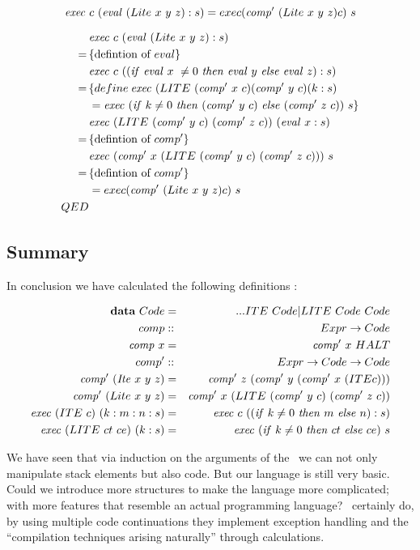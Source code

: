 \documentclass {article}
\begin{document}
\[ \mathit{exec\ } c\ (\mathit{eval\ }  (Lite\ x\ y\ z):s) = exec (\mathit{comp'\ }  (Lite\ x\ y\ z) c)\ s  \]

\begin{align*}
&\Exec c\ (\evalf  (Lite\ x\ y\ z):s) \\
=\, & \{ \mbox{defintion of}\ eval \} \\
&\Exec c\ ((\ifff \evalf  x\ \not= 0\ \tthen \evalf  y\ \eelse \evalf  z) :s) \\
=\, & \{ define\: \Exec (LITE\ (\Compp  x\ c) (\Compp  y\ c) (k : s) \\
&= \Exec (\ifff k \not=0\ \tthen (\Compp  y\ c)\ \eelse (\Compp  z\ c))\ s \} \\
& \Exec (LITE\ (\Compp  y\ c)\ (\Compp  z\ c))\ (\evalf  x : s) \\
=\, & \{ \mbox{defintion of}\ comp' \} \\
& \Exec (\Compp  x\ (LITE\ (\Compp  y\ c)\ (\Compp  z\ c)))\ s \\
=\, & \{\mbox{defintion of}\ comp' \} \\
&= exec (\Compp  (Lite\ x\ y\ z) c)\ s \\
QED
\end{align*}

\subsection{Summary}

In conclusion we have calculated the following definitions
												\cite[page 11]{bandh}:

\begin{eqnarray*}
	\textbf{data}\ Code &=& ...ITE\ Code | LITE\ Code\ Code \\
	comp 				  &::& Expr \rightarrow Code \\
	\Comp x			  &=& \Compp  x\ HALT \\
	comp'				  &::& Expr \rightarrow Code \rightarrow Code \\
	\Compp  (\Ite x\ y\ z) 
				&=& \Compp  z\ (\Compp  y\ (\Compp  x\ (ITE c))) \\
	\Compp  (Lite\ x\ y\ z) 
				&=& \Compp  x\ (LITE\ (\Compp  y\ c)\ (\Compp  z\ c)) \\
	\Exec (ITE\ c)\ (k:m:n:s) 
						&=& \Exec c\ ((\ifff k \not=0\ \tthen m\ \eelse n):s) \\
	\Exec (LITE\ ct\ ce)\ (k:s) 
						&=& \Exec (\ifff k \not=0\ \tthen ct\ \eelse ce)\ s
\end{eqnarray*}

We have seen that via 
induction on the arguments of the 
\vm\ we can not only manipulate
stack elements but also code.
But our language is still very
basic.
Could we introduce more structures
to make the language more complicated;
with more features that resemble
an actual programming language?
\BH\ certainly do, by using 
multiple code continuations they
implement exception handling and the
``compilation techniques arising naturally''
through calculations\cite[page 24]{bandh}.
\end{document}
